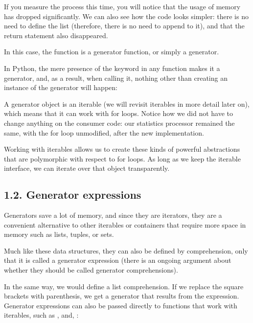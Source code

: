 \documentclass[a4paper,10pt,english]{sphinxmanual}
\begin{document}
If you measure the process this time, you will notice that the usage of memory has dropped
significantly. We can also see how the code looks simpler: there is no need to define the
list (therefore, there is no need to append to it), and that the return statement also
disappeared.

In this case, the  function is a generator function, or simply a generator.

In Python, the mere presence of the keyword  in any function makes it a generator,
and, as a result, when calling it, nothing other than creating an instance of the generator
will happen:

\begin{sphinxVerbatim}[commandchars=\\\{\}]
\end{sphinxVerbatim}

A generator object is an iterable (we will revisit iterables in more detail later on), which
means that it can work with for loops. Notice how we did not have to change anything on
the consumer code: our statistics processor remained the same, with the for loop
unmodified, after the new implementation.

Working with iterables allows us to create these kinds of powerful abstractions that are
polymorphic with respect to for loops. As long as we keep the iterable interface, we can
iterate over that object transparently.


\subsection{1.2. Generator expressions}
\label{\detokenize{chapters/7_generators/index:generator-expressions}}
Generators save a lot of memory, and since they are iterators, they are a convenient
alternative to other iterables or containers that require more space in memory such as lists,
tuples, or sets.

Much like these data structures, they can also be defined by comprehension, only that it is
called a generator expression (there is an ongoing argument about whether they should be
called generator comprehensions).

In the same way, we would define a list comprehension. If we replace the square brackets
with parenthesis, we get a generator that results from the expression. Generator
expressions can also be passed directly to functions that work with iterables, such as ,
and, :
\end{document}
